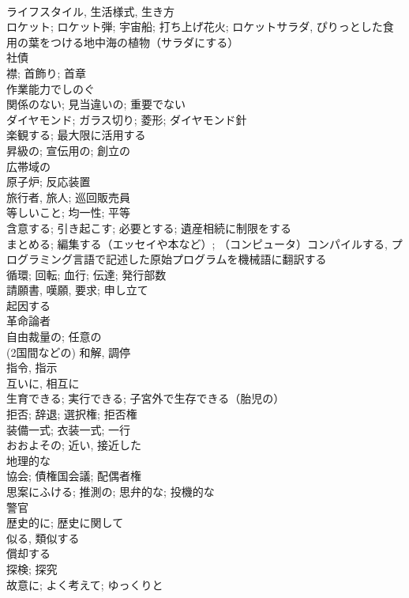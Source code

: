 \documentclass[8pt]{extreport}
\begin{document}
\begin{CJK}{UTF8}{min}
\\	ライフスタイル, 生活様式, 生き方	
\\	ロケット; ロケット弾; 宇宙船; 打ち上げ花火; ロケットサラダ, ぴりっとした食用の葉をつける地中海の植物（サラダにする）	
\\	社債	
\\	襟; 首飾り; 首章	
\\	作業能力でしのぐ	
\\	関係のない; 見当違いの; 重要でない	
\\	ダイヤモンド; ガラス切り; 菱形; ダイヤモンド針	
\\	楽観する; 最大限に活用する	
\\	昇級の; 宣伝用の; 創立の	
\\	広帯域の	
\\	原子炉; 反応装置	
\\	旅行者, 旅人; 巡回販売員	
\\	等しいこと; 均一性; 平等	
\\	含意する; 引き起こす; 必要とする; 遺産相続に制限をする	
\\	まとめる; 編集する（エッセイや本など）; （コンピュータ）コンパイルする, プログラミング言語で記述した原始プログラムを機械語に翻訳する	
\\	循環; 回転; 血行; 伝達; 発行部数	
\\	請願書, 嘆願, 要求; 申し立て	
\\	起因する	
\\	革命論者	
\\	自由裁量の; 任意の	
\\	(2国間などの) 和解, 調停	
\\	指令, 指示	
\\	互いに, 相互に	
\\	生育できる; 実行できる; 子宮外で生存できる（胎児の）	
\\	拒否; 辞退; 選択権; 拒否権	
\\	装備一式; 衣装一式; 一行	
\\	おおよその; 近い, 接近した	
\\	地理的な	
\\	協会; 債権国会議; 配偶者権	
\\	思案にふける; 推測の; 思弁的な; 投機的な	
\\	警官	
\\	歴史的に; 歴史に関して	
\\	似る, 類似する	
\\	償却する	
\\	探検; 探究	
\\	故意に; よく考えて; ゆっくりと	

\end{CJK}
\end{document}
